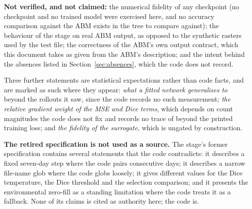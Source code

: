 \documentclass[11pt,a4paper]{article}
\begin{document}
\textbf{Not verified, and not claimed:} the numerical fidelity of any
checkpoint (no checkpoint and no trained model were exercised here, and no
accuracy comparison against the ABM exists in the tree to compare against);
the behaviour of the stage on real ABM output, as opposed to the synthetic
rasters used by the test file; the correctness of the ABM's own
output contract, which this document takes as given from the ABM's
description; and the intent behind the absences listed in
Section~\ref{sec:absences}, which the code does not record.

Three further statements are statistical expectations rather than code
facts, and are marked as such where they appear: \emph{what a fitted
network generalises to} beyond the rollouts it saw, since the code records
no such measurement; \emph{the relative gradient weight of the MSE and
Dice terms}, which depends on count magnitudes the code does not fix and
records no trace of beyond the printed training loss; and \emph{the fidelity
of the surrogate}, which is ungated by construction.

\textbf{The retired specification is not used as a source.} The stage's
former specification contains several statements that the code contradicts:
it describes a fixed seven-day step where the code pairs consecutive days;
it describes a narrow file-name glob where the code globs loosely; it gives
different values for the Dice temperature, the Dice threshold and the
selection comparison; and it presents the environmental zero-fill as a
standing limitation where the code treats it as a fallback. None of its
claims is cited as authority here; the code is.
\end{document}
